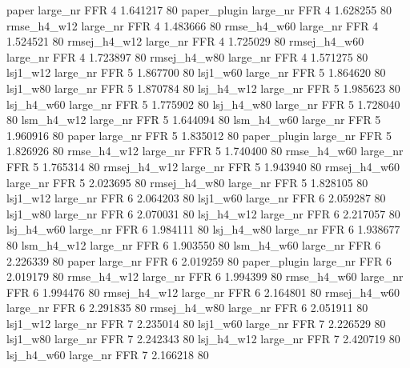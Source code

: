        paper   large_nr      FFR                 4 1.641217 80
paper_plugin   large_nr      FFR                 4 1.628255 80
 rmse_h4_w12   large_nr      FFR                 4 1.483666 80
 rmse_h4_w60   large_nr      FFR                 4 1.524521 80
rmsej_h4_w12   large_nr      FFR                 4 1.725029 80
rmsej_h4_w60   large_nr      FFR                 4 1.723897 80
rmsej_h4_w80   large_nr      FFR                 4 1.571275 80
    lsj1_w12   large_nr      FFR                 5 1.867700 80
    lsj1_w60   large_nr      FFR                 5 1.864620 80
    lsj1_w80   large_nr      FFR                 5 1.870784 80
  lsj_h4_w12   large_nr      FFR                 5 1.985623 80
  lsj_h4_w60   large_nr      FFR                 5 1.775902 80
  lsj_h4_w80   large_nr      FFR                 5 1.728040 80
  lsm_h4_w12   large_nr      FFR                 5 1.644094 80
  lsm_h4_w60   large_nr      FFR                 5 1.960916 80
       paper   large_nr      FFR                 5 1.835012 80
paper_plugin   large_nr      FFR                 5 1.826926 80
 rmse_h4_w12   large_nr      FFR                 5 1.740400 80
 rmse_h4_w60   large_nr      FFR                 5 1.765314 80
rmsej_h4_w12   large_nr      FFR                 5 1.943940 80
rmsej_h4_w60   large_nr      FFR                 5 2.023695 80
rmsej_h4_w80   large_nr      FFR                 5 1.828105 80
    lsj1_w12   large_nr      FFR                 6 2.064203 80
    lsj1_w60   large_nr      FFR                 6 2.059287 80
    lsj1_w80   large_nr      FFR                 6 2.070031 80
  lsj_h4_w12   large_nr      FFR                 6 2.217057 80
  lsj_h4_w60   large_nr      FFR                 6 1.984111 80
  lsj_h4_w80   large_nr      FFR                 6 1.938677 80
  lsm_h4_w12   large_nr      FFR                 6 1.903550 80
  lsm_h4_w60   large_nr      FFR                 6 2.226339 80
       paper   large_nr      FFR                 6 2.019259 80
paper_plugin   large_nr      FFR                 6 2.019179 80
 rmse_h4_w12   large_nr      FFR                 6 1.994399 80
 rmse_h4_w60   large_nr      FFR                 6 1.994476 80
rmsej_h4_w12   large_nr      FFR                 6 2.164801 80
rmsej_h4_w60   large_nr      FFR                 6 2.291835 80
rmsej_h4_w80   large_nr      FFR                 6 2.051911 80
    lsj1_w12   large_nr      FFR                 7 2.235014 80
    lsj1_w60   large_nr      FFR                 7 2.226529 80
    lsj1_w80   large_nr      FFR                 7 2.242343 80
  lsj_h4_w12   large_nr      FFR                 7 2.420719 80
  lsj_h4_w60   large_nr      FFR                 7 2.166218 80
